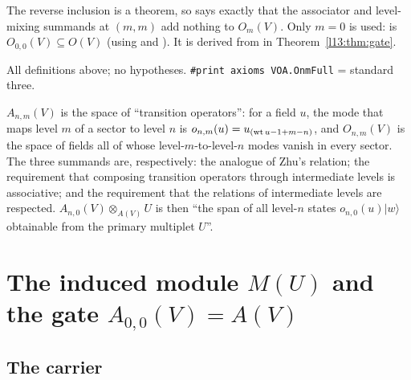 \begin{dictionary}
The reverse inclusion  is a theorem, so  says exactly that the associator and
level-mixing summands at $(m,m)$ add nothing to $O_m(V)$. Only $m = 0$ is used:  is $O_{0,0}(V)\subseteq O(V)$
(using  and ). It is derived from  in Theorem~\ref{l13:thm:gate}.
\end{dictionary}

\begin{status}
All definitions above; no hypotheses. \texttt{\#print axioms VOA.OnmFull} = standard three.
\end{status}

\begin{physics}
$A_{n,m}(V)$ is the space of ``transition operators'': for a field $u$, the mode that maps level $m$ of a sector to level $n$
is $o_{n,m}(u) = u_{(\operatorname{wt} u-1+m-n)}$, and $O_{n,m}(V)$ is the space of fields all of whose level-$m$-to-level-$n$ modes vanish in
every sector. The three summands are, respectively: the analogue of Zhu's relation; the requirement that composing transition
operators through intermediate levels is associative; and the requirement that the relations of intermediate levels are
respected. $A_{n,0}(V)\otimes_{A(V)}U$ is then ``the span of all level-$n$ states $o_{n,0}(u)|w\rangle$ obtainable from the
primary multiplet $U$''.
\end{physics}

\section{The induced module \texorpdfstring{$M(U)$}{M(U)} and the gate \texorpdfstring{$A_{0,0}(V) = A(V)$}{A\_\{0,0\}(V)=A(V)}}\label{l13:sec:MU}

\subsection{The carrier}


